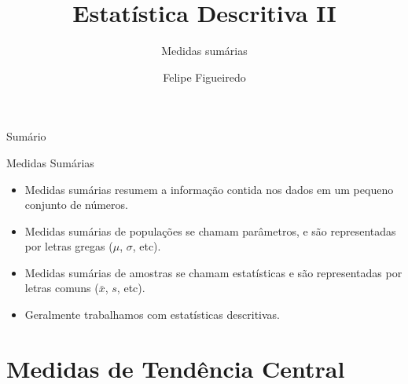 \documentclass{beamer}
\title%
{Estatística Descritiva II}
\subtitle
{Medidas sumárias} %
\author%
{Felipe Figueiredo}%
\institute[INTO] %
{
Instituto Nacional de Traumatologia e Ortopedia}
\date%
{}
\begin{document}
\begin{frame}
  \titlepage
\end{frame}

\begin{frame}{Sumário}
  \tableofcontents
\end{frame}




\begin{frame}{Medidas Sumárias}
  \begin{itemize}
  \item Medidas sumárias resumem a informação contida nos dados em um
    pequeno conjunto de números.
  \item Medidas sumárias de \alert{populações} se chamam
    \alert{parâmetros}, e são representadas por letras gregas ($\mu$,
    $\sigma$, etc).
  \item Medidas sumárias de \alert{amostras} se chamam \alert{estatísticas} e são representadas por letras comuns ($\bar{x}$,
    $s$, etc).
  \item Geralmente trabalhamos com estatísticas descritivas.
  \end{itemize}
\end{frame}

\section{Medidas de Tendência Central}
\end{document}
